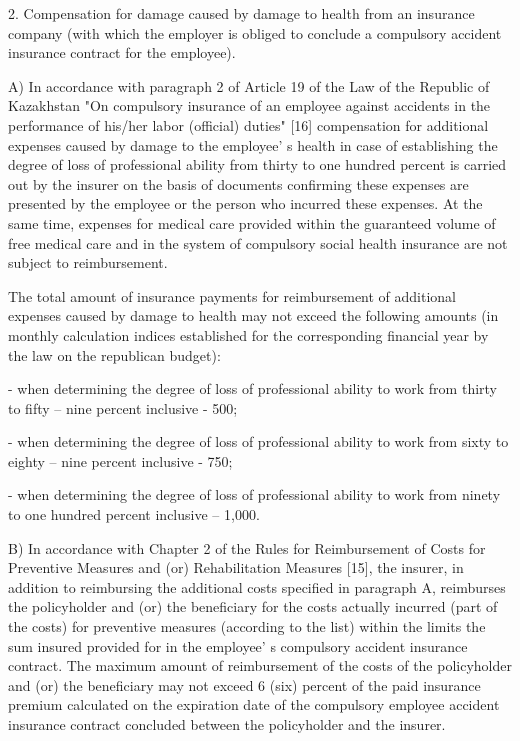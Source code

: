 \begin{multicols}{2}
2. Compensation for damage caused by damage to health from an insurance
company (with which the employer is obliged to conclude a compulsory
accident insurance contract for the employee).

A) In accordance with paragraph 2 of Article 19 of the Law of the
Republic of Kazakhstan "On compulsory insurance of an employee against
accidents in the performance of his/her labor (official) duties"
{[}16{]} compensation for additional expenses caused by damage to the
employee' s health in case of establishing the degree of
loss of professional ability from thirty to one hundred percent is
carried out by the insurer on the basis of documents confirming these
expenses are presented by the employee or the person who incurred these
expenses. At the same time, expenses for medical care provided within
the guaranteed volume of free medical care and in the system of
compulsory social health insurance are not subject to reimbursement.

The total amount of insurance payments for reimbursement of additional
expenses caused by damage to health may not exceed the following amounts
(in monthly calculation indices established for the corresponding
financial year by the law on the republican budget):

- when determining the degree of loss of professional ability to work
from thirty to fifty -- nine percent inclusive - 500;

- when determining the degree of loss of professional ability to work
from sixty to eighty -- nine percent inclusive - 750;

- when determining the degree of loss of professional ability to work
from ninety to one hundred percent inclusive -- 1,000.

B) In accordance with Chapter 2 of the Rules for Reimbursement of Costs
for Preventive Measures and (or) Rehabilitation Measures {[}15{]}, the
insurer, in addition to reimbursing the additional costs specified in
paragraph A, reimburses the policyholder and (or) the beneficiary for
the costs actually incurred (part of the costs) for preventive measures
(according to the list) within the limits the sum insured provided for
in the employee' s compulsory accident insurance
contract. The maximum amount of reimbursement of the costs of the
policyholder and (or) the beneficiary may not exceed 6 (six) percent of
the paid insurance premium calculated on the expiration date of the
compulsory employee accident insurance contract concluded between the
policyholder and the insurer.


\end{multicols}
